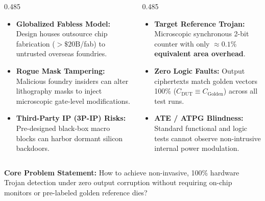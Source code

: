 \documentclass[aspectratio=169,11pt]{beamer}
\begin{document}
\begin{frame}[t]
  \vspace*{-0.18cm}

  \begin{columns}[T, onlytextwidth]
    \begin{column}{0.485\textwidth}
      \begin{glassbox}[top=2pt, bottom=2pt, left=6pt, right=6pt, title={The Semiconductor Trust Crisis}]{}
        \begin{itemize}\setlength{\itemsep}{1.2pt}
          \item \textbf{Globalized Fabless Model:} Design houses outsource chip fabrication ($>\$20\text{B}$/fab) to untrusted overseas foundries.
          \item \textbf{Rogue Mask Tampering:} Malicious foundry insiders can alter lithography masks to inject microscopic gate-level modifications.
          \item \textbf{Third-Party IP (3P-IP) Risks:} Pre-designed black-box macro blocks can harbor dormant silicon backdoors.
        \end{itemize}
      \end{glassbox}
    \end{column}

    \begin{column}{0.485\textwidth}
      \begin{glassbox}[top=2pt, bottom=2pt, left=6pt, right=6pt, title={The Stealth Challenge: Why Logic Testing Fails}]{}
        \begin{itemize}\setlength{\itemsep}{1.2pt}
          \item \textbf{Target Reference Trojan:} Microscopic synchronous 2-bit counter with only \textbf{$\approx 0.1\%$ equivalent area overhead}.
          \item \textbf{Zero Logic Faults:} Output ciphertexts match golden vectors 100\% ($C_{\text{DUT}} \equiv C_{\text{Golden}}$) across all test runs.
          \item \textbf{ATE / ATPG Blindness:} Standard functional and logic tests cannot observe non-intrusive internal power modulation.
        \end{itemize}
      \end{glassbox}
    \end{column}
  \end{columns}

  \vspace{0.04cm}
  \begin{glasscard}[top=2pt, bottom=2pt, left=6pt, right=6pt]
    \textbf{\color{textPrimary}Core Problem Statement:} How to achieve non-invasive, 100\% hardware Trojan detection under zero output corruption without requiring on-chip monitors or pre-labeled golden reference dies?
  \end{glasscard}
\end{frame}
\end{document}

